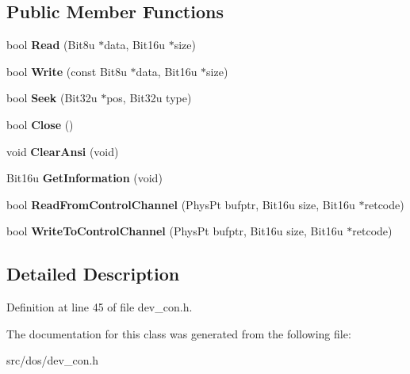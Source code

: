 \subsection*{Public Member Functions}
\begin{DoxyCompactItemize}
\item 
\hypertarget{classdevice__CON_a748000d06f15adcb17f329e32eda83fb}{bool {\bfseries Read} (Bit8u $\ast$data, Bit16u $\ast$size)}\label{classdevice__CON_a748000d06f15adcb17f329e32eda83fb}

\item 
\hypertarget{classdevice__CON_a46c071095c3de95fa316d90c5443fd5f}{bool {\bfseries Write} (const Bit8u $\ast$data, Bit16u $\ast$size)}\label{classdevice__CON_a46c071095c3de95fa316d90c5443fd5f}

\item 
\hypertarget{classdevice__CON_a6d744c09531d7691b538a7f13b3cef7a}{bool {\bfseries Seek} (Bit32u $\ast$pos, Bit32u type)}\label{classdevice__CON_a6d744c09531d7691b538a7f13b3cef7a}

\item 
\hypertarget{classdevice__CON_a69784b10d975098ba5fd46dc4cf33593}{bool {\bfseries Close} ()}\label{classdevice__CON_a69784b10d975098ba5fd46dc4cf33593}

\item 
\hypertarget{classdevice__CON_acf82cb98642a058ba380f15492cb8833}{void {\bfseries Clear\-Ansi} (void)}\label{classdevice__CON_acf82cb98642a058ba380f15492cb8833}

\item 
\hypertarget{classdevice__CON_a8db295befbc8bf8ba25504e65241a4fe}{Bit16u {\bfseries Get\-Information} (void)}\label{classdevice__CON_a8db295befbc8bf8ba25504e65241a4fe}

\item 
\hypertarget{classdevice__CON_aed3d4935317137834c51fbba69221c8f}{bool {\bfseries Read\-From\-Control\-Channel} (Phys\-Pt bufptr, Bit16u size, Bit16u $\ast$retcode)}\label{classdevice__CON_aed3d4935317137834c51fbba69221c8f}

\item 
\hypertarget{classdevice__CON_a6b8675aaab24d4ceeed07a669b8bb512}{bool {\bfseries Write\-To\-Control\-Channel} (Phys\-Pt bufptr, Bit16u size, Bit16u $\ast$retcode)}\label{classdevice__CON_a6b8675aaab24d4ceeed07a669b8bb512}

\end{DoxyCompactItemize}


\subsection{Detailed Description}


Definition at line 45 of file dev\-\_\-con.\-h.



The documentation for this class was generated from the following file\-:\begin{DoxyCompactItemize}
\item 
src/dos/dev\-\_\-con.\-h\end{DoxyCompactItemize}
